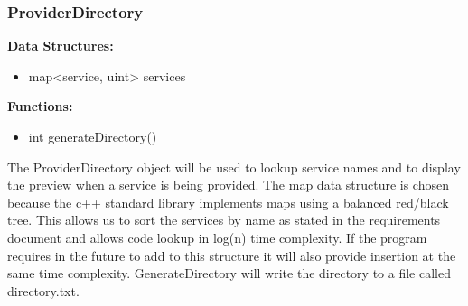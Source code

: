 \documentclass{article}
\begin{document}
\subsubsection{ProviderDirectory}
\textbf{Data Structures:}
\begin{itemize}
   \item map<service, uint> services
\end{itemize}
\textbf{Functions:}
\begin{itemize}
   \item int generateDirectory()
\end{itemize}
The ProviderDirectory object will be used to lookup service names and to display the preview when a service is being provided. The map data structure is chosen because the c++ standard library implements maps using a balanced red/black tree. This allows us to sort the services by name as stated in the requirements document and allows code lookup in log(n) time complexity. If the program requires in the future to add to this structure it will also provide insertion at the same time complexity. GenerateDirectory will write the directory to a file called directory.txt.
\end{document}
